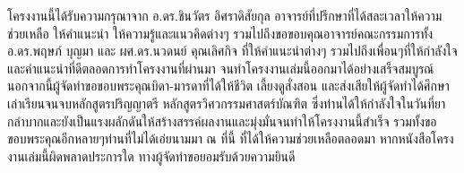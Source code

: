 \begin{acknowledgments}
    โครงงานนี้ได้รับความกรุณาจาก อ.ดร.ชินวัตร อิศราดิสัยกุล อาจารย์ที่ปรึกษาที่ได้สละเวลาให้ความช่วยเหลือ ให้คำแนะนำ ให้ความรู้และแนวคิดต่างๆ รวมไปถึงขอขอบคุณอาจารย์คณะกรรมการทั้ง 
    อ.ดร.พฤษภ์ บุญมา และ ผศ.ดร.นวดนย์ คุณเลิศกิจ ที่ให้คำแนะนำต่างๆ รวมไปถึงเพื่อนๆที่ให้กำลังใจและคำแนะนำที่ดีตลอดการทำโครงงานที่ผ่านมา จนทำโครงงานเล่มนี้ออกมาได้อย่างเสร็จสมบูรณ์
    นอกจากนี้ผู้จัดทําขอขอบพระคุณบิดา-มารดาที่ได้ให้ชีวิต เลี้ยงดูสั่งสอน และส่งเสียให้ผู้จัดทําได้ศึกษาเล่าเรียนจนจบหลักสูตรปริญญาตรี หลักสูตรวิศวกรรมศาสตร์บัณฑิต ซึ่งท่านได้ให้กําลังใจในวันที่ยากลําบากและยังเป็นแรงผลักดันให้สร้างสรรค์ผลงานและมุ่งมั่นจนทําให้โครงงานนี้สําเร็จ รวมทั้งขอขอบพระคุณอีกหลายๆท่านที่ไม่ได้เอ่ยนามมา ณ ที่นี้ ที่ได้ให้ความช่วยเหลือตลอดมา หากหนังสือโครงงานเล่มนี้ผิดพลาดประการใด ทางผู้จัดทําขอยอมรับด้วยความยินดี

\end{acknowledgments}%
\fi %

\contentspage

\ifproject
\figurelistpage

\tablelistpage
\fi %



